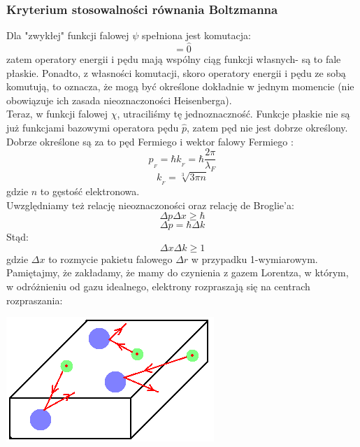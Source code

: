 \subsubsection{Kryterium stosowalności równania Boltzmanna}
Dla "zwykłej" funkcji falowej $\psi$ spełniona jest komutacja: 
\begin{equation}[\hat{H},\hat{p}]=\hat{0}\end{equation}
zatem operatory energii i pędu mają wspólny ciąg funkcji własnych- są to fale płaskie. Ponadto, z własności komutacji, skoro operatory energii i pędu ze sobą komutują, to oznacza, że mogą być określone dokładnie w jednym momencie (nie obowiązuje ich zasada nieoznaczoności Heisenberga).\\
Teraz, w funkcji falowej $\chi$, utraciliśmy tę jednoznaczność. Funkcje płaskie nie są już funkcjami bazowymi operatora pędu $\hat{p}$, zatem  pęd nie jest dobrze określony. Dobrze określone są za to pęd Fermiego i wektor falowy Fermiego :
\begin{equation}p_{_F}=\hbar k_{_F}=\hbar\frac{2\pi}{\lambda_{F}}\end{equation}
\begin{equation}k_{_F}=\sqrt[3]{3\pi n}\end{equation}
gdzie $n$ to gęstość elektronowa.\\
Uwzględniamy też relację nieoznaczoności oraz relację de Broglie'a:
\begin{equation}\Delta p\Delta x \ge \hbar\end{equation}
\begin{equation} \Delta p=\hbar\Delta k\end{equation}
Stąd:
\begin{equation}\Delta x \Delta k \ge 1\end{equation}
gdzie $\Delta x$ to rozmycie pakietu falowego $\Delta r$ w przypadku 1-wymiarowym.\\
Pamiętajmy, że zakładamy, że mamy do czynienia z gazem Lorentza, w którym, w odróżnieniu od gazu idealnego, elektrony rozpraszają się na centrach rozpraszania:
\begin{center}\includegraphics[scale=0.7]{obrazki/wykl_8_obrazek2.png}\end{center}
